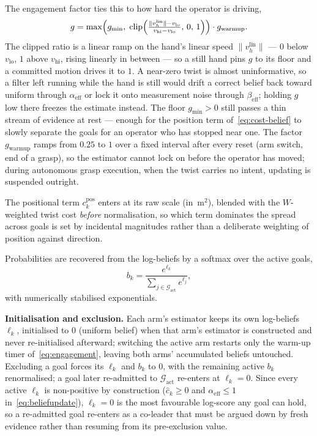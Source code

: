 The engagement factor ties this to how hard the operator is driving,
\begin{equation}
g = \max\Bigl(g_{\min},\; \operatorname{clip}\Bigl(\tfrac{\|v_h^{\text{lin}}\| - v_{\text{lo}}}{v_{\text{hi}} - v_{\text{lo}}},\,0,\,1\Bigr)\Bigr)\cdot g_{\text{warmup}}.
\label{eq:engagement}
\end{equation}
The clipped ratio is a linear ramp on the hand's linear speed $\|v_h^{\text{lin}}\|$ --- $0$ below $v_{\text{lo}}$, $1$ above $v_{\text{hi}}$, rising linearly in between --- so a still hand pins $g$ to its floor and a committed motion drives it to $1$. A near-zero twist is almost uninformative, so a filter left running while the hand is still would drift a correct belief back toward uniform through $\alpha_{\text{eff}}$ or lock it onto measurement noise through $\beta_{\text{eff}}$; holding $g$ low there freezes the estimate instead. The floor $g_{\min} > 0$ still passes a thin stream of evidence at rest --- enough for the position term of~\eqref{eq:cost-belief} to slowly separate the goals for an operator who has stopped near one. The factor $g_{\text{warmup}}$ ramps from $0.25$ to $1$ over a fixed interval after every reset (arm switch, end of a grasp), so the estimator cannot lock on before the operator has moved; during autonomous grasp execution, when the twist carries no intent, updating is suspended outright.

The positional term $c_k^{\text{pos}}$ enters at its raw scale (in~$\text{m}^2$), blended with the $W$-weighted twist cost \emph{before} normalisation, so which term dominates the spread across goals is set by incidental magnitudes rather than a deliberate weighting of position against direction.

Probabilities are recovered from the log-beliefs by a softmax over the active goals,
\begin{equation}
b_k = \frac{e^{\ell_k}}{\sum_{j \in \mathcal{G}_{\text{act}}} e^{\ell_j}},
\label{eq:beliefnorm}
\end{equation}
with numerically stabilised exponentials.

\textbf{Initialisation and exclusion.} Each arm's estimator keeps its own log-beliefs $\ell_k$, initialised to $0$ (uniform belief) when that arm's estimator is constructed and never re-initialised afterward; switching the active arm restarts only the warm-up timer of~\eqref{eq:engagement}, leaving both arms' accumulated beliefs untouched. Excluding a goal forces its $\ell_k$ and $b_k$ to $0$, with the remaining active $b_k$ renormalised; a goal later re-admitted to $\mathcal{G}_{\text{act}}$ re-enters at $\ell_k = 0$. Since every active $\ell_k$ is non-positive by construction ($\hat{c}_k \ge 0$ and $\alpha_{\text{eff}} \le 1$ in~\eqref{eq:beliefupdate}), $\ell_k = 0$ is the most favourable log-score any goal can hold, so a re-admitted goal re-enters as a co-leader that must be argued down by fresh evidence rather than resuming from its pre-exclusion value.

